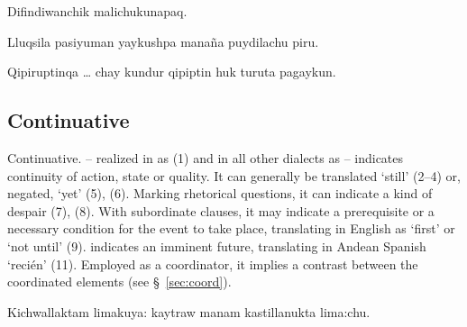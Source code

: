 %
{Difindiwanchik malichukunapaq.}%
{}%
{}{}%

%
{Lluqsila pasiyuman yaykushpa mana\~na puydila\uo{}chu piru.}%
{}%
{}{}%

%
{Qipiruptinqa \dots{} chay kundur qipiptin huk turuta pagaykun.}%
{}%
{}{}%

\subsection{Continuative }
Continuative.  -- realized in \CH{} as  (1) and in all other dialects as  -- indicates continuity of action, state or quality. It can generally be translated `still' (2--4) or, negated, `yet' (5), (6). Marking rhetorical questions, it can indicate a kind of despair (7), (8). With subordinate clauses, it may indicate a prerequisite or a necessary condition for the event to take place, translating in English as `first' or `not until' (9).  indicates an imminent future, translating in Andean Spanish `reci\'en' (11). Employed as a coordinator, it implies a contrast between the coordinated elements (see \S~\ref{sec:coord}).

%
{Kichwallaktam limakuya: kaytraw manam kastillanukta lima:chu.}%
{}%
{}{}%

